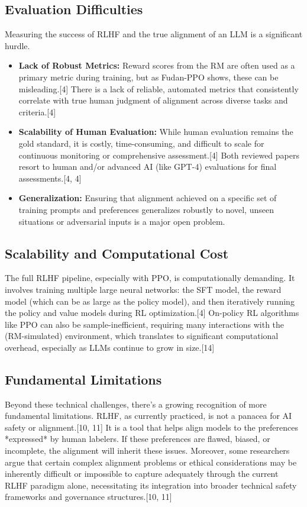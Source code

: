 \documentclass[10pt,journal,compsoc]{IEEEtran} %
\begin{document}
\subsection{Evaluation Difficulties}
Measuring the success of RLHF and the true alignment of an LLM is a significant hurdle.
\begin{itemize}
    \item \textbf{Lack of Robust Metrics:} Reward scores from the RM are often used as a primary metric during training, but as Fudan-PPO shows, these can be misleading.[4] There is a lack of reliable, automated metrics that consistently correlate with true human judgment of alignment across diverse tasks and criteria.[4]
    \item \textbf{Scalability of Human Evaluation:} While human evaluation remains the gold standard, it is costly, time-consuming, and difficult to scale for continuous monitoring or comprehensive assessment.[4] Both reviewed papers resort to human and/or advanced AI (like GPT-4) evaluations for final assessments.[4, 4]
    \item \textbf{Generalization:} Ensuring that alignment achieved on a specific set of training prompts and preferences generalizes robustly to novel, unseen situations or adversarial inputs is a major open problem.
\end{itemize}

\subsection{Scalability and Computational Cost}
The full RLHF pipeline, especially with PPO, is computationally demanding. It involves training multiple large neural networks: the SFT model, the reward model (which can be as large as the policy model), and then iteratively running the policy and value models during RL optimization.[4] On-policy RL algorithms like PPO can also be sample-inefficient, requiring many interactions with the (RM-simulated) environment, which translates to significant computational overhead, especially as LLMs continue to grow in size.[14]

\subsection{Fundamental Limitations}
Beyond these technical challenges, there's a growing recognition of more fundamental limitations. RLHF, as currently practiced, is not a panacea for AI safety or alignment.[10, 11] It is a tool that helps align models to the preferences *expressed* by human labelers. If these preferences are flawed, biased, or incomplete, the alignment will inherit these issues. Moreover, some researchers argue that certain complex alignment problems or ethical considerations may be inherently difficult or impossible to capture adequately through the current RLHF paradigm alone, necessitating its integration into broader technical safety frameworks and governance structures.[10, 11]
\end{document}
